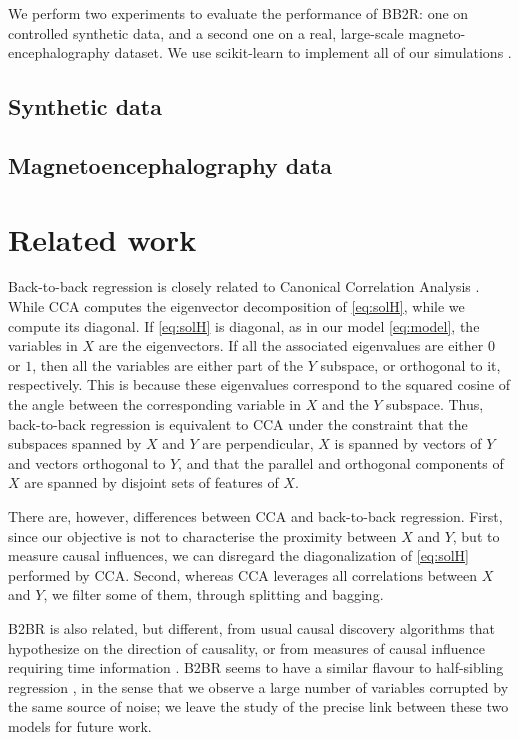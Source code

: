 \documentclass{article}
\begin{document}
We perform two experiments to evaluate the performance of BB2R: one on controlled synthetic data, and a second one on a real, large-scale magneto-encephalography dataset.
%
We use scikit-learn to implement all of our simulations \citep{sklearn}.

\subsection{Synthetic data}
\label{sec:experiment_synthetic}



\subsection{Magnetoencephalography data}
\label{sec:experiment_real}



\section{Related work}

Back-to-back regression is closely related to Canonical Correlation Analysis \citep{cca_hotelling}.
%
While CCA computes the eigenvector decomposition of \eqref{eq:solH}, while we compute its diagonal.
%
If \eqref{eq:solH} is diagonal, as in our model \eqref{eq:model}, the variables in $X$ are the eigenvectors.
%
If all the associated eigenvalues are either $0$ or $1$, then all the variables are either part of the $Y$ subspace, or orthogonal to it, respectively.
%
This is because these eigenvalues correspond to the squared cosine of the angle between the corresponding variable in $X$ and the $Y$ subspace.
%
Thus, back-to-back regression is equivalent to CCA under the constraint that the subspaces spanned by $X$ and $Y$ are perpendicular, $X$ is spanned by vectors of $Y$ and vectors orthogonal to $Y$, and that the parallel and orthogonal components of $X$ are spanned by disjoint sets of features of $X$.

There are, however, differences between CCA and back-to-back regression.
%
First, since our objective is not to characterise the proximity between $X$ and $Y$, but to measure causal influences, we can disregard the diagonalization of \eqref{eq:solH} performed by CCA.
%
Second, whereas CCA leverages all correlations between $X$ and $Y$, we filter some of them, through splitting and bagging.

B2BR is also related, but different, from usual causal discovery algorithms \citep{peters2017elements} that hypothesize on the direction of causality, or from measures of causal influence requiring time information \citep{granger1969investigating, janzing2013quantifying}.
%
B2BR seems to have a similar flavour to half-sibling regression \citep{scholkopf2016modeling}, in the sense that we observe a large number of variables corrupted by the same source of noise; we leave the study of the precise link between these two models for future work. 
\end{document}
